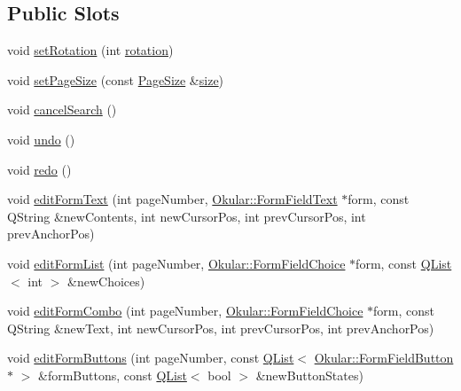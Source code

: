 \subsection*{Public Slots}
\begin{DoxyCompactItemize}
\item 
void \hyperlink{classOkular_1_1Document_a2f2f1091749143d82fd30f1d3d6cef87}{set\+Rotation} (int \hyperlink{classOkular_1_1Document_aa419f95f101b5672926c7cd4485f12e6}{rotation})
\item 
void \hyperlink{classOkular_1_1Document_a21c63211b744c1fd6e6357cfa0eda7f7}{set\+Page\+Size} (const \hyperlink{classOkular_1_1PageSize}{Page\+Size} \&\hyperlink{synctex__parser_8c_aa23c661441688350614bd6a350d2b6ff}{size})
\item 
void \hyperlink{classOkular_1_1Document_a1f2fa321ed9357c5110b78a0c2502a8d}{cancel\+Search} ()
\item 
void \hyperlink{classOkular_1_1Document_a2948b7150ebee16ee611734226c5d247}{undo} ()
\item 
void \hyperlink{classOkular_1_1Document_a55a775164d34b00f74c4242ed952f676}{redo} ()
\item 
void \hyperlink{classOkular_1_1Document_a2ee7954b954aece4dd25faebc24b37e9}{edit\+Form\+Text} (int page\+Number, \hyperlink{classOkular_1_1FormFieldText}{Okular\+::\+Form\+Field\+Text} $\ast$form, const Q\+String \&new\+Contents, int new\+Cursor\+Pos, int prev\+Cursor\+Pos, int prev\+Anchor\+Pos)
\item 
void \hyperlink{classOkular_1_1Document_a4238ade3326c1ab2d8f4ae1a33947e2c}{edit\+Form\+List} (int page\+Number, \hyperlink{classOkular_1_1FormFieldChoice}{Okular\+::\+Form\+Field\+Choice} $\ast$form, const \hyperlink{classQList}{Q\+List}$<$ int $>$ \&new\+Choices)
\item 
void \hyperlink{classOkular_1_1Document_af510014e1ae816d8e602c3b4abb754d5}{edit\+Form\+Combo} (int page\+Number, \hyperlink{classOkular_1_1FormFieldChoice}{Okular\+::\+Form\+Field\+Choice} $\ast$form, const Q\+String \&new\+Text, int new\+Cursor\+Pos, int prev\+Cursor\+Pos, int prev\+Anchor\+Pos)
\item 
void \hyperlink{classOkular_1_1Document_aa578ae4d0b957bfbc867b14372f287fd}{edit\+Form\+Buttons} (int page\+Number, const \hyperlink{classQList}{Q\+List}$<$ \hyperlink{classOkular_1_1FormFieldButton}{Okular\+::\+Form\+Field\+Button} $\ast$ $>$ \&form\+Buttons, const \hyperlink{classQList}{Q\+List}$<$ bool $>$ \&new\+Button\+States)
\end{DoxyCompactItemize}
